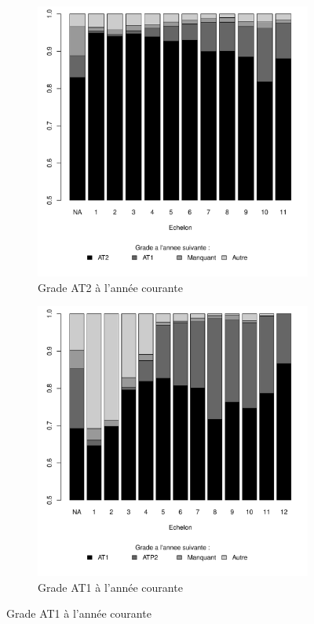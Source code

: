 \documentclass[11pt,a4paper]{article}
\begin{document}
\begin{figure}[ht] 
  \caption{Situation d'une année à l'autre, selon l'échelon}
  \label{evo_by_ech} 
  \begin{subfigure}[b]{0.5\linewidth}
      \caption{Grade AT2 à l'année courante}
    \label{evo_by_ech_0} 
    \centering
    \includegraphics[width=1\linewidth]{next_AT2.pdf} 
  \end{subfigure}%
  \begin{subfigure}[b]{0.5\linewidth}
        \caption{Grade AT1 à l'année courante} 
    \label{evo_by_ech_1} 
    \centering
    \includegraphics[width=1\linewidth]{next_AT1.pdf} 
  \end{subfigure} 
\end{figure}
\end{document}
